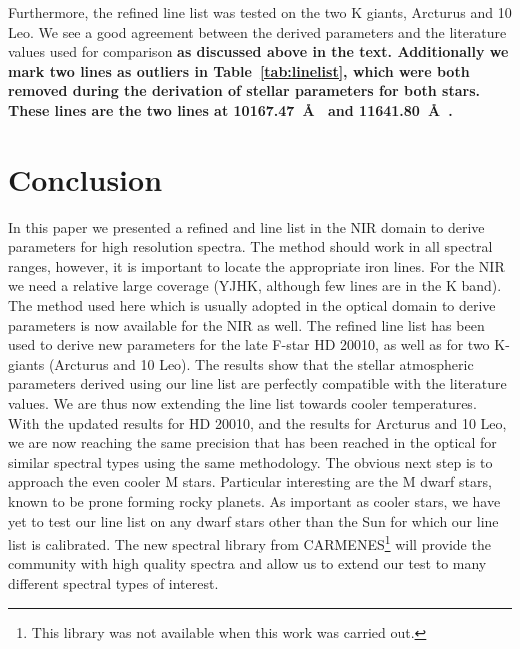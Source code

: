 \documentclass{aa}
\begin{document}
Furthermore, the refined line list was tested on the two K giants, Arcturus and 10 Leo. We see a
good agreement between the derived parameters and the literature values used for comparison {\bf as
discussed above in the text. Additionally we mark two lines as outliers in Table~\ref{tab:linelist},
which were both removed during the derivation of stellar parameters for both stars. These lines are
the two  lines at \SI{10167.47}{\AA{}} and \SI{11641.80}{\AA{}}.}



\section{Conclusion}
\label{sec:conclusion}

In this paper we presented a refined  and  line list in the NIR domain to
derive parameters for high resolution spectra. The method should work in all spectral ranges,
however, it is important to locate the appropriate iron lines. For the NIR we need a relative large
coverage (YJHK, although few lines are in the K band). The method used here which is usually adopted
in the optical domain to derive parameters is now available for the NIR as well. The refined line
list has been used to derive new parameters for the late F-star HD 20010, as well as for two
K-giants (Arcturus and 10 Leo). The results show that the stellar atmospheric parameters derived
using our line list are perfectly compatible with the literature values. We are thus now extending
the line list towards cooler temperatures. With the updated results for HD 20010, and the results
for Arcturus and 10 Leo, we are now reaching the same precision that has been reached in the optical
for similar spectral types using the same methodology. The obvious next step is to approach the even
cooler M stars. Particular interesting are the M dwarf stars, known to be prone forming rocky
planets. As important as cooler stars, we have yet to test our line list on any dwarf stars other
than the Sun for which our line list is calibrated. The new spectral library from
CARMENES\footnote{This library was not available when this work was carried out.}
\citep{Reiners2017} will provide the community with high quality spectra and allow us to extend our
test to many different spectral types of interest.
\end{document}
